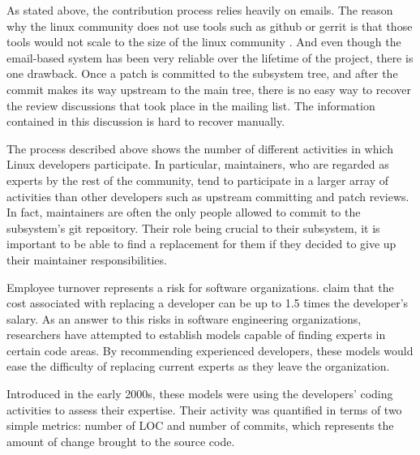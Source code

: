 As stated above, the contribution process relies heavily on emails. The reason why the linux community does not use tools such as github or gerrit is that those tools would not scale to the size of the linux community \citep{armstrong}. And even though the email-based system has been very reliable over the lifetime of the project, there is one drawback. Once a patch is committed to the subsystem tree, and after the commit makes its way upstream to the main tree, there is no easy way to recover the review discussions that took place in the mailing list. The information contained in this discussion is hard to recover manually. 

The process described above shows the number of different activities in which Linux developers participate. In particular, maintainers, who are regarded as experts by the rest of the community, tend to participate in a larger array of activities than other developers such as upstream committing and patch reviews. In fact, maintainers are often the only people allowed to commit to the subsystem's git repository. Their role being crucial to their subsystem, it is important to be able to find a replacement for them if they decided to give up their maintainer responsibilities.










Employee turnover represents a risk for software organizations. \citep{turnover} claim that the cost associated with replacing a developer can be up to 1.5 times the developer's salary. As an answer to this risks in software engineering organizations, researchers have attempted to establish models capable of finding experts in certain code areas. By recommending experienced developers, these models would ease the difficulty of replacing current experts as they leave the organization. 


Introduced in the early 2000s\citep{mockus02}\citep{McDonald}, these models were using the developers' coding activities to assess their expertise. Their activity was quantified in terms of two simple metrics: number of \ac{LOC} and number of commits, which represents the amount of change brought to the source code. 

